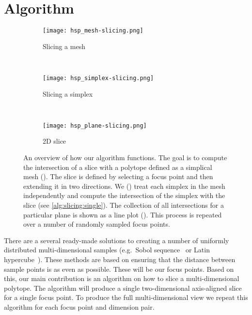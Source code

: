 \section{Algorithm}
\label{sec:algorithm}

\begin{figure*}[ht!]
  \centering
  \begin{subfigure}[b]{0.33\textwidth}
    \texttt{[image: hsp\_mesh-slicing.png]}
    \caption{%
      Slicing a mesh
    }
    \label{fig:slicing:mesh}
  \end{subfigure}
  ~
  \begin{subfigure}[b]{0.33\textwidth}
    \centering
    \texttt{[image: hsp\_simplex-slicing.png]}
    \caption{%
      Slicing a simplex
    }
    \label{fig:slicing:simplex}
  \end{subfigure}
  ~
  \begin{subfigure}[b]{0.24\textwidth}
    \centering
    \texttt{[image: hsp\_plane-slicing.png]}
    \caption{%
      2D slice
    }
    \label{fig:slicing:plane}
  \end{subfigure}
  \caption{%
    An overview of how our algorithm functions. The goal is to compute the
    intersection of a slice with a polytope defined as a simplical mesh
    (). The slice is defined by selecting a focus
    point and then extending it in two directions. We 
    () treat each simplex in the mesh 
    independently and compute the intersection of the simplex with the slice
    (see \autoref{alg:slicing:single}). The collection of all intersections
    for a particular plane is shown as a line plot 
    (). This process is repeated over a number of 
    randomly sampled focus points.
  }
  \label{fig:slicing}
\end{figure*}

There are a several ready-made solutions to creating a number of uniformly
distributed multi-dimensional samples (e.g.\ Sobol sequence~\cite{Sobol:1967}
or Latin hypercube~\cite{Mckay:1979}). These methods are based on ensuring that
the distance between sample points is as even as possible.  These will be our
focus points. Based on this, our main contribution is an algorithm
on how to slice a multi-dimensional polytope.  The algorithm will produce a
single two-dimensional axis-aligned slice for a single focus point. To produce
the full multi-dimensional view we repeat this algorithm for each focus point
and dimension pair.


